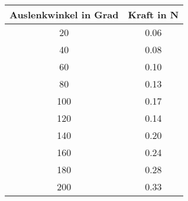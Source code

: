 
\begin{center}
	\begin{tabular}{ c | c }
	\hline
		Auslenkwinkel in Grad & Kraft in N \\
	\hline
		20 & 0.06 \\
		40 & 0.08 \\ 
		60 & 0.10 \\
		80 & 0.13 \\
		100 & 0.17 \\
		120 & 0.14 \\ 
		140 & 0.20 \\
		160 & 0.24 \\
		180 & 0.28 \\
		200 & 0.33 \\
	\end{tabular}
\end{center}
